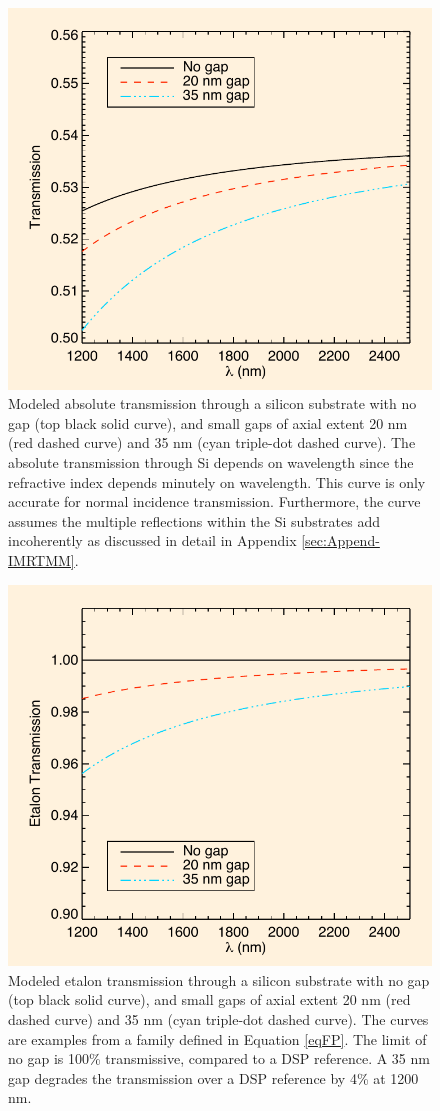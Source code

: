 \documentclass[osajnl,preprint,showpacs,superscriptaddress,12pt]{revtex4-1} %
\begin{document}
\begin{figure}[htbp]
\centerline{\includegraphics[width=0.65\columnwidth]{figs/20140421_absolute.pdf}}
\caption{Modeled absolute transmission through a silicon substrate with no gap (top black solid curve), and small gaps of axial extent 20 nm (red dashed curve) and 35 nm (cyan triple-dot dashed curve)\label{figAbsoluteTrans}.  The absolute transmission through Si depends on wavelength since the refractive index depends minutely on wavelength.  This curve is only accurate for normal incidence transmission.  Furthermore, the curve assumes the multiple reflections within the Si substrates add incoherently as discussed in detail in Appendix \ref{sec:Append-IMRTMM}.}
\end{figure}

\begin{figure}[htbp]
\centerline{\includegraphics[width=0.65\columnwidth]{figs/20140421_absoluteB.pdf}}
\caption{Modeled etalon transmission through a silicon substrate with no gap (top black solid curve), and small gaps of axial extent 20 nm (red dashed curve) and 35 nm (cyan triple-dot dashed curve)\label{figEtalonRelTrans}.  The curves are examples from a family defined in Equation \ref{eqFP}.   The limit of no gap is 100\% transmissive, compared to a DSP reference.  A 35 nm gap degrades the transmission over a DSP reference by 4\% at 1200 nm.}
\end{figure}
\end{document}
